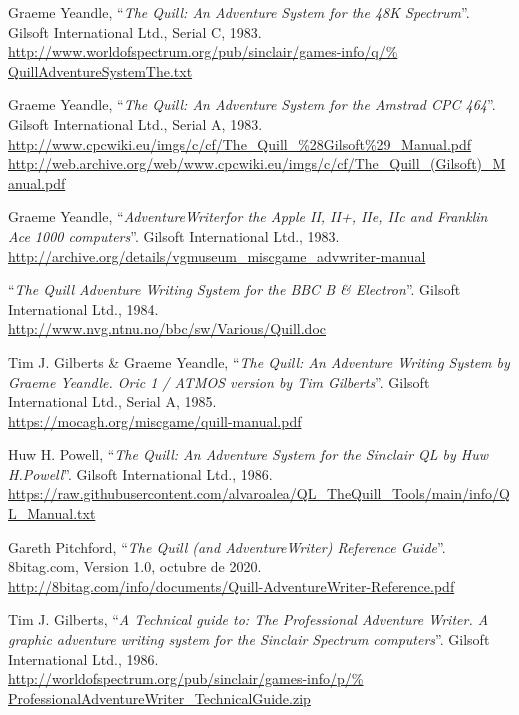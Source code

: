 \documentclass[11pt, a5paper]{article}
\begin{document}
\begin{thebibliography}{99}

  Graeme Yeandle,
  ``\emph{The Quill: An Adventure System for the 48K Spectrum}''.
  Gilsoft International Ltd.,
  Serial C,
  1983.\\
  \url{http://www.worldofspectrum.org/pub/sinclair/games-info/q/%
       QuillAdventureSystemThe.txt}

  Graeme Yeandle,
  ``\emph{The Quill: An Adventure System for the Amstrad CPC 464}''.
  Gilsoft International Ltd.,
  Serial A,
  1983.\\
  \url{http://www.cpcwiki.eu/imgs/c/cf/The_Quill_%28Gilsoft%29_Manual.pdf}\\
  \url{http://web.archive.org/web/www.cpcwiki.eu/imgs/c/cf/The_Quill_(Gilsoft)_Manual.pdf}

  Graeme Yeandle,
  ``\emph{AdventureWriter\texttrademark for the Apple II, II+, IIe, IIc and Franklin Ace 1000 computers}''.
  Gilsoft International Ltd.,
  1983.\\
  \url{http://archive.org/details/vgmuseum_miscgame_advwriter-manual}

  ``\emph{The Quill Adventure Writing System for the BBC B \& Electron}''.
  Gilsoft International Ltd.,
  1984.\\
  \url{http://www.nvg.ntnu.no/bbc/sw/Various/Quill.doc}

  Tim J. Gilberts \& Graeme Yeandle,
  ``\emph{The Quill: An Adventure Writing System by Graeme Yeandle. Oric 1 /
  ATMOS version by Tim Gilberts}''.
  Gilsoft International Ltd.,
  Serial A,
  1985.\\
  \url{https://mocagh.org/miscgame/quill-manual.pdf}

  Huw H. Powell,
  ``\emph{The Quill: An Adventure System for the Sinclair QL by Huw H.Powell}''.
  Gilsoft International Ltd.,
  1986.\\
  \url{https://raw.githubusercontent.com/alvaroalea/QL_TheQuill_Tools/main/info/QL_Manual.txt}

  Gareth Pitchford,
  ``\emph{The Quill (and AdventureWriter) Reference Guide}''.
  8bitag.com,
  Version 1.0,
  octubre de 2020.\\
  \url{http://8bitag.com/info/documents/Quill-AdventureWriter-Reference.pdf}

  Tim J. Gilberts,
  ``\emph{A Technical guide to: The Professional Adventure Writer. A graphic
  adventure writing system for the Sinclair Spectrum computers}''.
  Gilsoft International Ltd.,
  1986.\\
  \url{http://worldofspectrum.org/pub/sinclair/games-info/p/%
       ProfessionalAdventureWriter_TechnicalGuide.zip}


\end{thebibliography}
\end{document}
